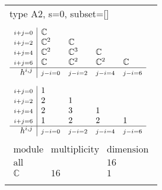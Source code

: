 \documentclass[crop,border=2mm]{standalone}
\begin{document}
\begin{tabular}{l}
{\huge type A2, s=0, subset=[]}\\ \\


$\displaystyle
\begin{array}{r|l l l l}
	{\scriptstyle i+j=0}&\mathbb{C}&&&\\
	{\scriptstyle i+j=2}&\mathbb{C}^{2}&\mathbb{C}&&\\
	{\scriptstyle i+j=4}&\mathbb{C}^{2}&\mathbb{C}^{3}&\mathbb{C}&\\
	{\scriptstyle i+j=6}&\mathbb{C}&\mathbb{C}^{2}&\mathbb{C}^{2}&\mathbb{C}\\
	\hline h^{i,j}&{\scriptstyle j-i=0}&{\scriptstyle j-i=2}&{\scriptstyle j-i=4}&{\scriptstyle j-i=6}
\end{array}
$ \\ \\


$\displaystyle
\begin{array}{r|l l l l}
	{\scriptstyle i+j=0}&1&&&\\
	{\scriptstyle i+j=2}&2&1&&\\
	{\scriptstyle i+j=4}&2&3&1&\\
	{\scriptstyle i+j=6}&1&2&2&1\\
	\hline h^{i,j}&{\scriptstyle j-i=0}&{\scriptstyle j-i=2}&{\scriptstyle j-i=4}&{\scriptstyle j-i=6}
\end{array}
$ \\ \\


$\displaystyle
\begin{array}{rll}
	\text{module}&\text{multiplicity}&\text{dimension} \\ \hline \text{all}&&16 \\
	\mathbb{C}&16&1
\end{array}
$ \\ \\

\end{tabular}
\end{document}
